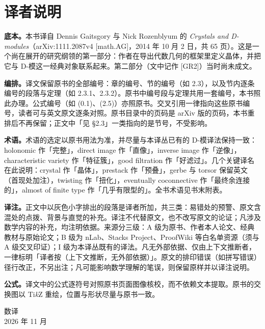 \chapter*{译者说明}

\textbf{底本。}本书译自 Dennis Gaitsgory 与 Nick Rozenblyum 的 \emph{Crystals and D-modules}（arXiv:1111.2087v4 [math.AG]，2014 年 10 月 2 日，共 65 页）。这是一个尚在展开的研究纲领的第一部分：作者在导出代数几何的框架里定义晶体，并把它与 D-模这一经典对象联系起来。第二部分（文中记作 [GR2]）当时尚未成文。

\textbf{编排。}译文保留原书的全部编号：章的编号、节的编号（如 2.3），以及节内逐条编号的段落与定理（如 2.3.1、2.3.2）。原书中编号段与定理共用一套编号，本书照此办理。公式编号（如 (0.1)、(2.5)）亦照原书。交叉引用一律指向这些原书编号，读者可与英文原文逐条对照。原书目录中的页码是 arXiv 版的页码，本书重排后不再保留；正文中「见 §2.3」一类指向的是节号，不受影响。

\textbf{术语。}术语的选定以原书用法为准，并尽量与本译丛已有的 D-模译法保持一致：holonomic 作「完整」，direct image 作「直像」，inverse image 作「逆像」，characteristic variety 作「特征簇」，good filtration 作「好滤过」。几个关键译名在此说明：crystal 作「晶体」，prestack 作「预叠」，gerbe 与 torsor 保留英文（首现处加注），twisting 作「扭化」，eventually coconnective 作「最终余连接的」，almost of finite type 作「几乎有限型的」。全书术语见书末附表。

\textbf{译注。}正文中以灰色小字排出的段落是译者所加，共三类：易错处的预警、原文含混处的点拨、背景与直觉的补充。译注不代替原文，也不改写原文的论证；凡涉及数学内容的补充，均注明依据。来源分三级：A 级为原书、作者本人论文、经典教材与原始论文；B 级为 nLab、Stacks Project、ProofWiki 等白名单资源（须与 A 级交叉印证）；I 级为本译丛既有的译法。凡无外部依据、仅由上下文推断者，一律标明「译者按（上下文推断，无外部依据）」。原文的排印错误（如拼写错误）径行改正，不另出注；凡可能影响数学理解的笔误，则保留原样并以译注说明。

\textbf{公式。}译文中的公式逐符号对照原书页面图像核校，而不依赖文本提取。原书的交换图以 Ti\emph{k}Z 重绘，位置与形状尽量与原书一致。

\vspace{1em}
\noindent 数译\\
2026 年 11 月
\clearpage
